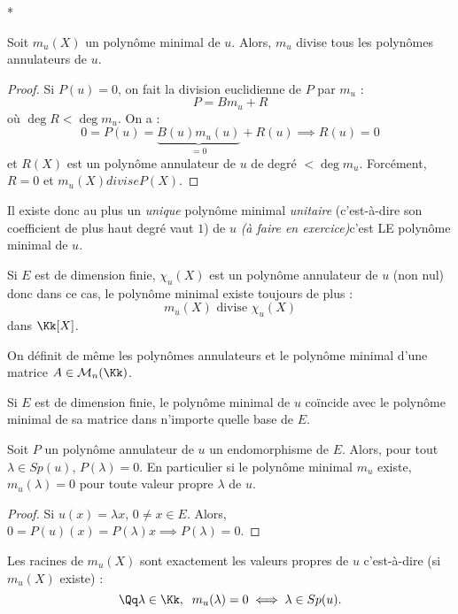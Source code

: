 \documentclass[class=report,crop=false]{standalone}
\newcommand{\exoo}{\emph{(à faire en exercice)}}
\newcommand{\Sp}{Sp}
\begin{document}
\begin{center}
*
\end{center}

\begin{proposition}
Soit $m_u(X)$ un polynôme minimal de $u$. Alors, $m_u$ {\sc divise tous les polynômes annulateurs de $u$.} 
\end{proposition}

\begin{proof}
Si $P(u) = 0$, on fait la division euclidienne de $P$ par $m_u$ :
\[P = Bm_u + R\]
où $\deg R < \deg m_u$. On a : 
\[0 = P(u)=\underbrace{B(u)m_u(u)}_{=0} + R(u) \implies R(u) = 0\]
et $R(X)$ est un polynôme annulateur de $u$ de degré $<\deg m_u$. Forcément, $R=0$ et $m_u(X) divise P(X)$. 
\end{proof}

Il existe donc au plus un {\it unique} polynôme minimal {\it unitaire} (c'est-à-dire son coefficient de plus haut degré vaut $1$) de $u$ \exoo c'est LE polynôme minimal de $u$.

\begin{remarque*}
Si $E$ est de dimension finie, $\chi_u(X)$ est un polynôme annulateur de $u$ (non nul) donc dans ce cas, le polynôme minimal existe toujours de plus :
\[m_u(X) \mbox{ divise } \chi_u(X)\]
dans $\Kk[X]$. 
\end{remarque*}

On définit de même les polynômes annulateurs et le polynôme minimal d'une matrice $A \in \mathcal{M}_n(\Kk)$.

\begin{exercicecours}
Si $E$ est de dimension finie, le polynôme minimal de $u$ co\"{i}ncide avec le polynôme minimal de sa matrice dans n'importe quelle base de $E$.
\end{exercicecours}

\begin{proposition}
Soit $P$ un polynôme annulateur de $u$ un endomorphisme de $E$. Alors, pour tout $\lambda \in \Sp(u)$, $P(\lambda) =0$. En particulier si le polynôme minimal $m_u$ existe, $m_u(\lambda) = 0$ pour toute valeur propre $\lambda$ de $u$. 
\end{proposition}

\begin{proof}
Si $u(x) =\lambda x$, $0 \neq x \in E$. Alors, $0 =P(u) (x) = P(\lambda)x \implies P(\lambda) =0$.
\end{proof}

\begin{proposition}
Les racines de $m_u(X)$ sont exactement les valeurs propres de $u$ c'est-à-dire (si $m_u(X)$ existe) : \[\Qq \lambda \in \Kk ,\;\; m_u(\lambda)=0 \iff \lambda \in \Sp(u) .\]

\end{proposition}
\end{document}
